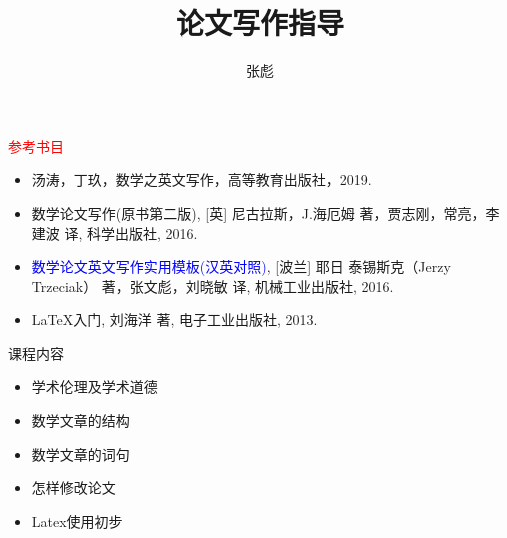 \documentclass[12pt]{ctexbeamer}
\newcommand{\red}[1]{\textcolor{red}{#1}}
\newcommand{\blue}[1]{\textcolor{blue}{#1}}
\begin{document}
\title[]{论文写作指导 }
\author[]{{\large 张彪} }

\date{}


%



\begin{frame}
\maketitle
\end{frame}



\begin{frame}


\red{参考书目}
	\begin{itemize}
	\item 汤涛，丁玖，数学之英文写作，高等教育出版社，2019.

	\item  数学论文写作(原书第二版), [英] 尼古拉斯，J.海厄姆 著，贾志刚，常亮，李建波 译, 科学出版社, 2016.

	\item \blue{数学论文英文写作实用模板(汉英对照)}, [波兰] 耶日 泰锡斯克（Jerzy Trzeciak） 著，张文彪，刘晓敏 译, 机械工业出版社, 2016.

	\item LaTeX入门, 刘海洋 著, 电子工业出版社, 2013.
	\end{itemize}





\end{frame}

\begin{frame}{课程内容}
		\begin{itemize}
		\item 学术伦理及学术道德

		\item 数学文章的结构

		\item 数学文章的词句

		\item 怎样修改论文

		\item Latex使用初步

	\end{itemize}

\end{frame}
\end{document}
